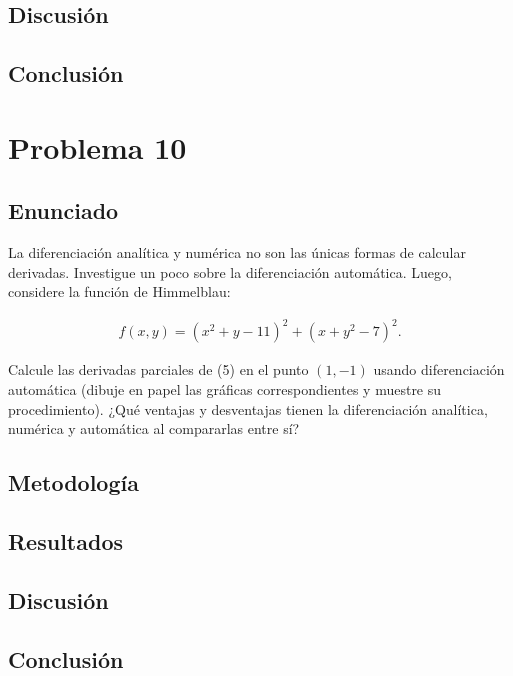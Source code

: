 \documentclass{article}
\begin{document}
\subsection{Discusión}

\subsection{Conclusión}

\section{Problema 10}

\subsection{Enunciado}
La diferenciación analítica y numérica no son las únicas formas de calcular derivadas. Investigue un poco sobre la diferenciación automática. Luego, considere la función de Himmelblau:

\begin{align}
    f(x,y) = (x^{2} + y - 11)^{2} + (x + y^{2} - 7)^{2}. \tag{5}
\end{align}

Calcule las derivadas parciales de (5) en el punto $(1,-1)$ usando diferenciación automática (dibuje en papel las gráficas correspondientes y muestre su procedimiento). ¿Qué ventajas y desventajas tienen la diferenciación analítica, numérica y automática al compararlas entre sí?

\subsection{Metodología}

\subsection{Resultados}
\setcounter{equation}{0}

\subsection{Discusión}

\subsection{Conclusión}
\end{document}
